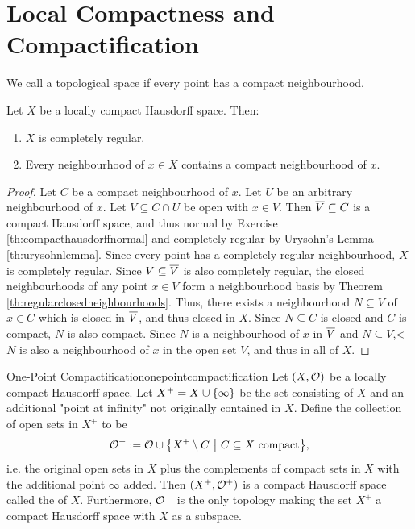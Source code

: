 \clearpage

\section{Local Compactness and Compactification}
\begin{importantdefinition}{}{}
	We call a topological space  if every point has a compact neighbourhood.
\end{importantdefinition}
\begin{theorem}
	Let $X$ be a locally compact Hausdorff space. Then:
	\begin{enumerate}
		\item $X$ is completely regular.
		\item Every neighbourhood of $x \in X$ contains a compact neighbourhood of $x$.
	\end{enumerate} 
\end{theorem}
\begin{proof}
	Let $C$ be a compact neighbourhood of $x$. Let $U$ be an arbitrary neighbourhood of $x$. Let $V \subseteq C \cap U$ be open with $x \in V$. Then $\overline{{V}} \subseteq C$ is a compact Hausdorff space, and thus normal by Exercise \ref{th:compacthausdorffnormal} and completely regular by Urysohn's Lemma \ref{th:urysohnlemma}. Since every point has a completely regular neighbourhood, $X$ is completely regular.
	\newpar
	Since $V \subseteq \overline{{V}}$ is also completely regular, the closed neighbourhoods of any point $x \in V$ form a neighbourhood basis by Theorem \ref{th:regularclosedneighbourhoods}. 
	\newpar
	Thus, there exists a neighbourhood $N \subseteq V$ of $x \in C$ which is closed in $\overline{{V}}$, and thus closed in $X$. Since $N \subseteq C$ is closed and $C$ is compact, $N$ is also compact. Since $N$ is a neighbourhood of $x$ in $\overline{{V}}$ and $N \subseteq V$,< $N$ is also a neighbourhood of $x$ in the open set $V$, and thus in all of $X$.
\end{proof}
\begin{importanttheorem}{One-Point Compactification}{onepointcompactification}
	Let $(X, \mathcal{O})$ be a locally compact Hausdorff space. Let $X^+ = X \cup \qty{\infty}$ be the set consisting of $X$ and an additional "point at infinity" not originally contained in $X$. 
	\newpar
	Define the collection of open sets in $X^+$ to be
	\begin{align*}
		\mathcal{O}^+ := \mathcal{O} \cup \qty{X^+ \setminus C ~\middle|~C \subseteq X \text{ compact}},
	\end{align*}
	i.e. the original open sets in $X$ plus the complements of compact sets in $X$ with the additional point $\infty$ added. Then $(X^+, \mathcal{O}^+)$ is a compact Hausdorff space called the  of $X$. Furthermore, $\mathcal{O}^+$ is the only topology making the set $X^+$ a compact Hausdorff space with $X$ as a subspace.
\end{importanttheorem}
\clearpage

